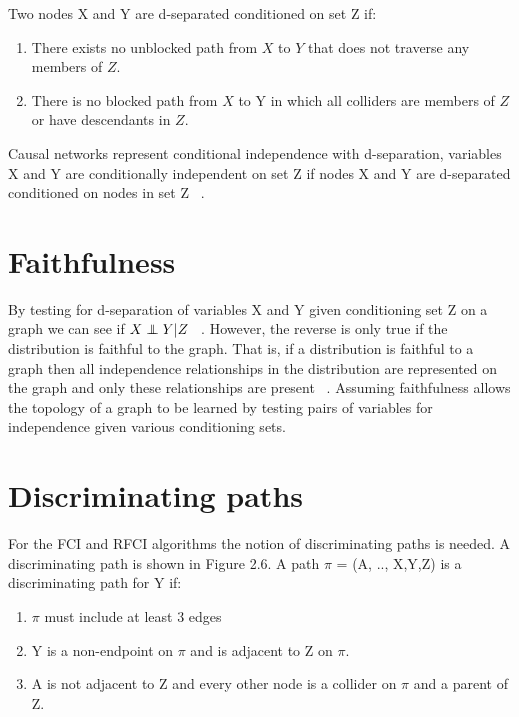 \documentclass{UoYCSproject}
\newcommand\independent{\protect\mathpalette{\protect\independenT}{\perp}}
\def\independenT#1#2{\mathrel{\rlap{$#1#2$}\mkern2mu{#1#2}}}
\begin{document}
Two nodes X and Y are d-separated conditioned on set Z if:
\begin{enumerate}
	\item There exists no unblocked path from $ X $ to $ Y $ that does not traverse any members of $ Z $. ~\parencite{pearl2003causality}
	\item There is no blocked path from $ X $ to Y in which all colliders are members of $ Z $ or have descendants in $ Z $.   ~\parencite{pearl2003causality}
\end{enumerate} 

Causal networks represent conditional independence with d-separation, variables X and Y are conditionally independent on set Z if nodes X and Y are d-separated conditioned on nodes in set Z ~\parencite{verma1990causal}.

\section{Faithfulness}


By testing for d-separation of variables X and Y given conditioning set Z on a graph we can see if $X \independent Y | Z$  ~\parencite{pearl2009}. However, the reverse is only true if the distribution is faithful to the graph. That is, if a distribution is faithful to a graph then all independence relationships in the distribution are represented on the graph and only these relationships are present  ~\parencite{scheines1997introduction}. Assuming faithfulness allows the topology of a graph to be learned by testing pairs of variables for independence given various conditioning sets.

\section{Discriminating paths}
For the FCI and RFCI algorithms the notion of discriminating paths is needed. A discriminating path is shown in Figure 2.6. A path $\pi$ = (A, .., X,Y,Z) is a discriminating path for Y if:

\begin{enumerate}
	\item $\pi$ must include at least 3 edges
	\item Y is a non-endpoint on $\pi$ and is adjacent to Z on $\pi$.
	\item A is not adjacent to Z and every other node is a collider on $\pi$ and a parent of Z. ~\parencite{colombo2012learning} 
\end{enumerate}
\end{document}
